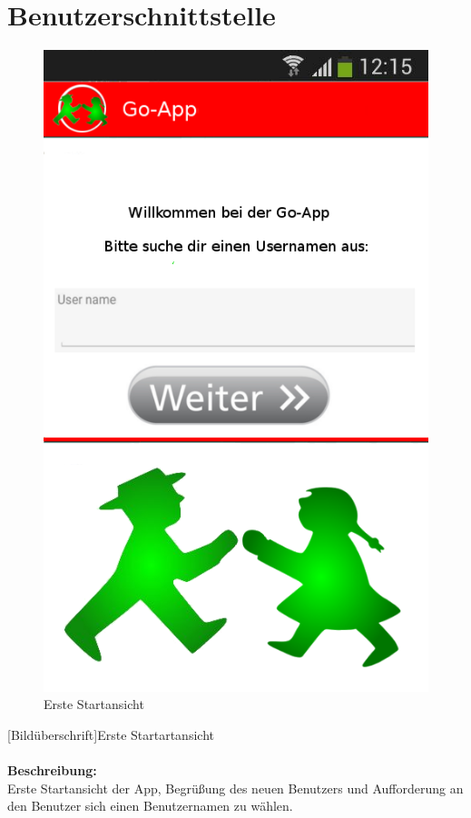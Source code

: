 \section{Benutzerschnittstelle}
\begin{figure} [H]
\caption{Erste Startansicht}
\includegraphics[scale = 0.5]{resources/images/startansicht.png}

\end{figure}
[Bildüberschrift]Erste Startartansicht\\ \\
\textbf{Beschreibung:}\\
Erste Startansicht der App, Begrüßung des neuen Benutzers und Aufforderung an den Benutzer sich einen Benutzernamen zu wählen.\\
